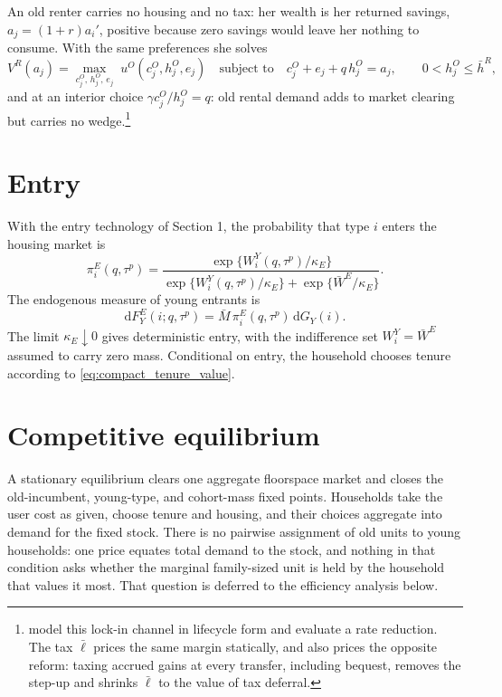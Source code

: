 \documentclass[11pt]{article}
\newcommand{\dd}{\mathrm d}
\newcommand{\1}{\mathbf 1}
\begin{document}
An old renter carries no housing and no tax: her wealth is her returned savings, $a_j=(1+r)a_i'$, positive because zero savings would leave her nothing to consume. With the same preferences she solves
\begin{equation}
V^R(a_j)
=
\max_{c_j^O,\,h_j^O,\,e_j}\;u^O(c_j^O,h_j^O,e_j)
\quad\text{subject to}\quad
c_j^O+e_j+q\,h_j^O=a_j,
\qquad
0<h_j^O\le\bar h^R,
\label{eq:compact_oldrenter_budget}
\end{equation}
and at an interior choice $\gamma c_j^O/h_j^O=q$: old rental demand adds to market clearing but carries no wedge.\footnote{\citet{coven2024} model this lock-in channel in lifecycle form and evaluate a rate reduction. The tax $\bar\ell$ prices the same margin statically, and also prices the opposite reform: taxing accrued gains at every transfer, including bequest, removes the step-up and shrinks $\bar\ell$ to the value of tax deferral.}

\section{Entry}

With the entry technology of Section 1, the probability that type $i$ enters the housing market is
\begin{equation}
\pi_i^E(q,\tau^p)
=
\frac{
\exp\{W_i^Y(q,\tau^p)/\kappa_E\}
}{
\exp\{W_i^Y(q,\tau^p)/\kappa_E\}
+
\exp\{\bar W^E/\kappa_E\}
}.
\label{eq:compact_entry_prob}
\end{equation}
The endogenous measure of young entrants is
\[
\dd F_Y^E(i;q,\tau^p)
=
\bar M\,\pi_i^E(q,\tau^p)\,\dd G_Y(i).
\]
The limit $\kappa_E\downarrow0$ gives deterministic entry, with the indifference set $W_i^Y=\bar W^E$ assumed to carry zero mass. Conditional on entry, the household chooses tenure according to \eqref{eq:compact_tenure_value}.

\section{Competitive equilibrium}

A stationary equilibrium clears one aggregate floorspace market and closes the old-incumbent, young-type, and cohort-mass fixed points. Households take the user cost as given, choose tenure and housing, and their choices aggregate into demand for the fixed stock. There is no pairwise assignment of old units to young households: one price equates total demand to the stock, and nothing in that condition asks whether the marginal family-sized unit is held by the household that values it most. That question is deferred to the efficiency analysis below.
\end{document}
